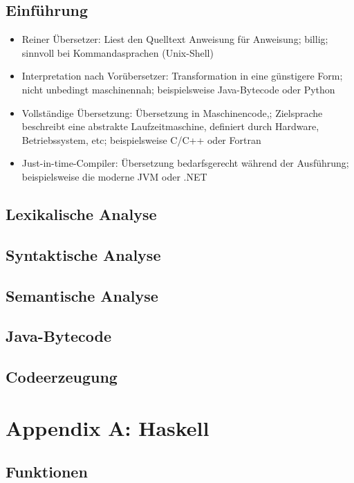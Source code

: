 \subsection{Einführung}
\begin{itemize}
	\item Reiner Übersetzer: Liest den Quelltext Anweisung für Anweisung; billig; sinnvoll bei Kommandasprachen (Unix-Shell)
	\item Interpretation nach Vorübersetzer: Transformation in eine günstigere Form; nicht unbedingt maschinennah; beispielsweise Java-Bytecode oder Python
	\item Vollständige Übersetzung: Übersetzung in Maschinencode,; Zielsprache beschreibt eine abstrakte Laufzeitmaschine, definiert durch Hardware, Betriebssystem, etc; beispielsweise C/C++ oder Fortran
	\item Just-in-time-Compiler: Übersetzung bedarfsgerecht während der Ausführung; beispielsweise die moderne JVM oder .NET
\end{itemize}


\subsection{Lexikalische Analyse}


\subsection{Syntaktische Analyse}


\subsection{Semantische Analyse}


\subsection{Java-Bytecode}


\subsection{Codeerzeugung}



\section{Appendix A: Haskell}

\subsection{Funktionen}

